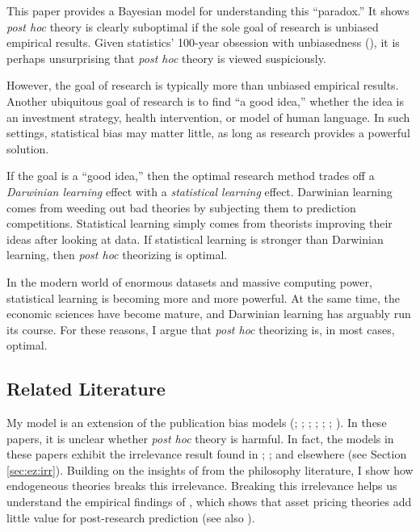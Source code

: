 \documentclass[12pt,english]{article}
\theoremstyle{plain}
\theoremstyle{plain}
\begin{document}
This paper provides a Bayesian model for understanding this ``paradox.'' It shows \emph{post hoc} theory is clearly suboptimal if the sole goal of research is unbiased empirical results. Given statistics' 100-year obsession with unbiasedness (\citet{efron2001statistical}), it is perhaps unsurprising that \emph{post hoc} theory is viewed suspiciously.

However, the goal of research is typically more than unbiased empirical results. Another ubiquitous goal of research is to find ``a good idea,'' whether the idea is an investment strategy, health intervention, or model of human language. In such settings, statistical bias may matter little, as long as research provides a powerful solution.

If the goal is a ``good idea,'' then the optimal research method trades off a \emph{Darwinian learning} effect with a \emph{statistical learning} effect. Darwinian learning comes from weeding out bad theories by subjecting them to prediction competitions. Statistical learning simply comes from theorists improving their ideas after looking at data. If statistical learning is stronger than Darwinian learning, then \emph{post hoc} theorizing is optimal.

In the modern world of enormous datasets and massive computing power, statistical learning is becoming more and more powerful. At the same time, the economic sciences have become mature, and Darwinian learning has arguably run its course. For these reasons, I argue that \emph{post hoc} theorizing is, in most cases, optimal.

\subsection{Related Literature}

My model is an extension of the publication bias models (\citet{hedges1984estimation}; \citet{brodeur2016star}; \citet{andrews2019identification}; \citet{abadie2020statistical}; \citet{chen2020publication}; \citet{jensen2023there}; \citet{kasy2024optimal}). In these papers, it is unclear whether \emph{post hoc} theory is harmful. In fact, the models in these papers exhibit the irrelevance result found in \citet{hempel1966philosophy}; \citet{lakatos1970methodology}; and elsewhere (see Section \ref{sec:ez:irr}). Building on the insights of from the philosophy literature, I show how endogeneous theories breaks this irrelevance. Breaking this irrelevance helps us understand the empirical findings of \citet{chen2024does}, which shows that asset pricing theories add little value for post-research prediction (see also \citet{chen2023high}).
\end{document}
